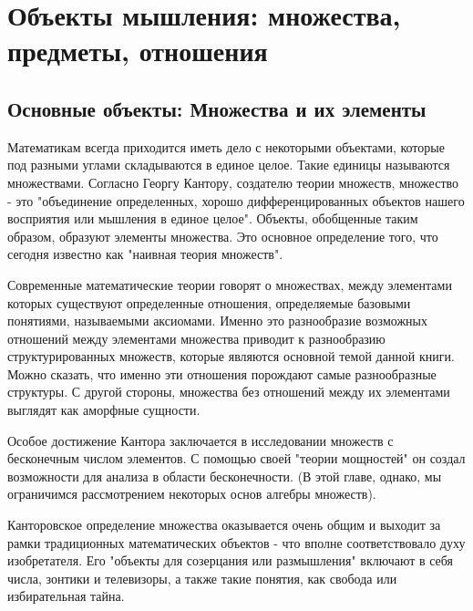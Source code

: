 \section{Объекты мышления: множества, предметы, отношения}
\subsection{Основные объекты: Множества и их элементы}
Математикам всегда приходится иметь дело с некоторыми объектами, которые под разными углами складываются в единое целое. Такие единицы называются множествами. Согласно Георгу Кантору, создателю теории множеств, множество - это "объединение определенных, хорошо дифференцированных объектов нашего восприятия или мышления в единое целое". Объекты, обобщенные таким образом, образуют элементы множества. Это основное определение того, что сегодня известно как "наивная теория множеств".

Современные математические теории говорят о множествах, между элементами которых существуют определенные отношения, определяемые базовыми понятиями, называемыми аксиомами. Именно это разнообразие возможных отношений между элементами множества приводит к разнообразию структурированных множеств, которые являются основной темой данной книги. Можно сказать, что именно эти отношения порождают самые разнообразные структуры. С другой стороны, множества без отношений между их элементами выглядят как аморфные сущности.

Особое достижение Кантора заключается в исследовании множеств с бесконечным числом элементов. С помощью своей "теории мощностей" он создал возможности для анализа в области бесконечности. (В этой главе, однако, мы ограничимся рассмотрением некоторых основ алгебры множеств).

Канторовское определение множества оказывается очень общим и выходит за рамки традиционных математических объектов - что вполне соответствовало духу изобретателя. Его "объекты для созерцания или размышления" включают в себя числа, зонтики и телевизоры, а также такие понятия, как свобода или избирательная тайна.

